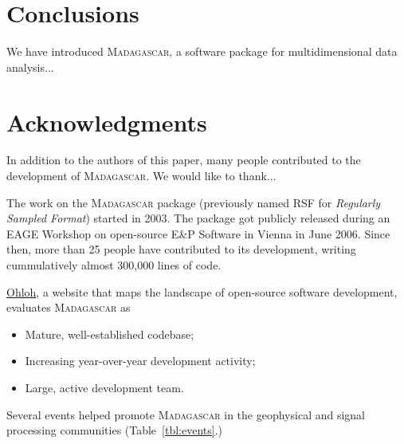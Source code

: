 \section{Conclusions}

We have introduced \textsc{Madagascar}, a software package for
multidimensional data analysis...

\section{Acknowledgments}

In addition to the authors of this paper, many people contributed to
the development of \textsc{Madagascar}. We would like to thank...



The work on the \textsc{Madagascar} package (previously named RSF for
\emph{Regularly Sampled Format}) started in 2003.  The package got
publicly released during an EAGE Workshop on open-source E\&P Software
in Vienna in June 2006. Since then, more than 25 people have
contributed to its development, writing cummulatively almost
300,000 lines of code.

\href{http://www.ohloh.net/}{Ohloh}, a website that maps the landscape
of open-source software development, evaluates \textsc{Madagascar} as
\begin{itemize}
\item Mature, well-established codebase;
\item Increasing year-over-year development activity;
\item Large, active development team.
\end{itemize}

Several events helped promote \textsc{Madagascar} in the geophysical
and signal processing communities (Table~\ref{tbl:events}.)









